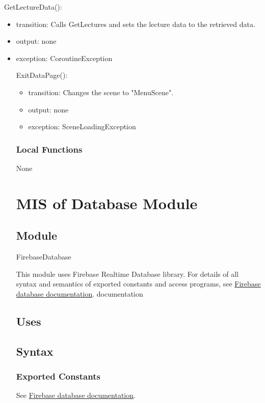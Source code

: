 \documentclass[12pt, titlepage]{article}
\begin{document}
\noindent GetLectureData():
\begin{itemize}
\item transition: Calls GetLectures and sets the lecture data to the retrieved data.
\item output: none
\item exception: CoroutineException

\noindent ExitDataPage():
\begin{itemize}
\item transition: Changes the scene to "MenuScene".
\item output: none
\item exception: SceneLoadingException
\end{itemize}

\subsubsection{Local Functions}

None

\newpage

\section{MIS of Database Module} \label{mDB}

\subsection{Module}

FirebaseDatabase

\noindent This module uses Firebase Realtime Database library. For details of all syntax and semantics of exported constants and access programs, see \href{https://firebase.google.com/docs/reference/unity/namespace/firebase/database}{Firebase database documentation}.
documentation
\subsection{Uses}

\subsection{Syntax}

\subsubsection{Exported Constants}
See \href{https://firebase.google.com/docs/reference/unity/namespace/firebase/database}{Firebase database documentation}.

\end{itemize}
\end{document}
